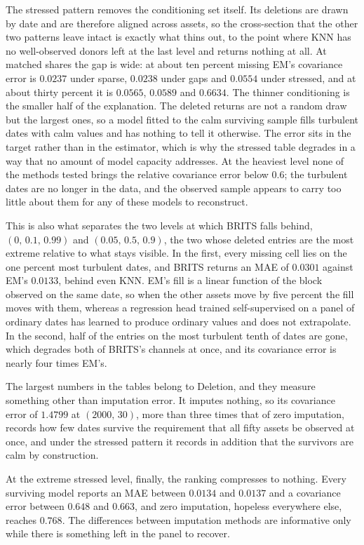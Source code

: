 The stressed pattern removes the conditioning set itself. Its deletions are
drawn by date and are therefore aligned across assets, so the cross-section
that the other two patterns leave intact is exactly what thins out, to the
point where KNN has no well-observed donors left at the last level and returns
nothing at all. At matched shares the gap is wide: at about ten percent missing
EM's covariance error is $0.0237$ under sparse, $0.0238$ under gaps and
$0.0554$ under stressed, and at about thirty percent it is $0.0565$, $0.0589$
and $0.6634$. The thinner conditioning is the smaller half of the explanation.
The deleted returns are not a random draw but the largest ones, so a model
fitted to the calm surviving sample fills turbulent dates with calm values and
has nothing to tell it otherwise. The error sits in the target rather than in
the estimator, which is why the stressed table degrades in a way that no amount
of model capacity addresses. At the heaviest level none of the methods tested
brings the relative covariance error below $0.6$; the turbulent dates are no
longer in the data, and the observed sample appears to carry too little about
them for any of these models to reconstruct.

This is also what separates the two levels at which BRITS falls behind,
$(0,\, 0.1,\, 0.99)$ and $(0.05,\, 0.5,\, 0.9)$, the two whose deleted entries
are the most extreme relative to what stays visible. In the first, every
missing cell lies on the one percent most turbulent dates, and BRITS returns an
MAE of $0.0301$ against EM's $0.0133$, behind even KNN. EM's fill is a linear
function of the block observed on the same date, so when the other assets move
by five percent the fill moves with them, whereas a regression head trained
self-supervised on a panel of ordinary dates has learned to produce ordinary
values and does not extrapolate. In the second, half of the entries on the most
turbulent tenth of dates are gone, which degrades both of BRITS's channels at
once, and its covariance error is nearly four times EM's.

The largest numbers in the tables belong to Deletion, and they measure
something other than imputation error. It imputes nothing, so its covariance
error of $1.4799$ at $(2000,\, 30)$, more than three times that of zero
imputation, records how few dates survive the requirement that all fifty assets
be observed at once, and under the stressed pattern it records in addition that
the survivors are calm by construction.

At the extreme stressed level, finally, the ranking compresses to nothing.
Every surviving model reports an MAE between $0.0134$ and $0.0137$ and a
covariance error between $0.648$ and $0.663$, and zero imputation, hopeless
everywhere else, reaches $0.768$. The differences between imputation methods
are informative only while there is something left in the panel to recover.

